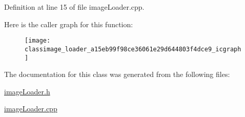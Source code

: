 Definition at line 15 of file image\+Loader.\+cpp.



Here is the caller graph for this function\+:\nopagebreak
\begin{figure}[H]
\begin{center}
\leavevmode
\texttt{[image: classimage\_loader\_a15eb99f98ce36061e29d644803f4dce9\_icgraph]}
\end{center}
\end{figure}




The documentation for this class was generated from the following files\+:\begin{DoxyCompactItemize}
\item 
\hyperlink{image_loader_8h}{image\+Loader.\+h}\item 
\hyperlink{image_loader_8cpp}{image\+Loader.\+cpp}\end{DoxyCompactItemize}
